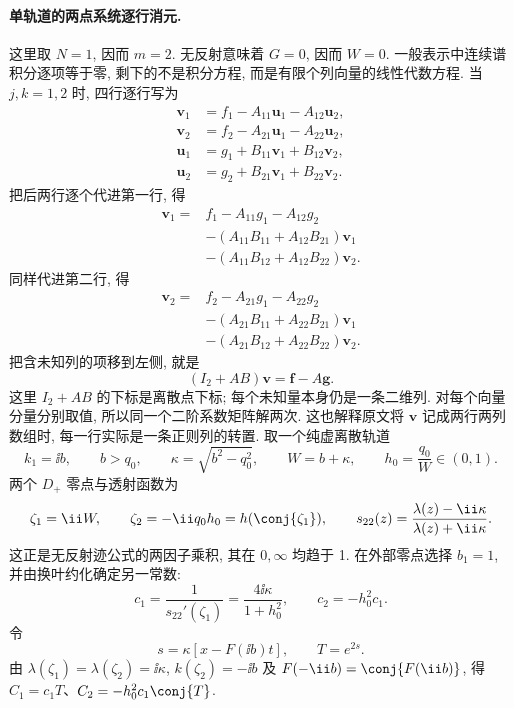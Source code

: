 \paragraph{单轨道的两点系统逐行消元.}
这里取 $N=1$, 因而 $m=2$. 无反射意味着 $G=0$, 因而 $W=0$.
一般表示中连续谱积分逐项等于零, 剩下的不是积分方程, 而是有限个列向量的线性代数方程.
当 $j,k=1,2$ 时, 四行逐行写为
\[
\begin{aligned}
\mathbf v_1
&=f_1- A_{11}\mathbf u_1- A_{12}\mathbf u_2,\\
\mathbf v_2
&=f_2- A_{21}\mathbf u_1- A_{22}\mathbf u_2,\\
\mathbf u_1
&=g_1+ B_{11}\mathbf v_1+ B_{12}\mathbf v_2,\\
\mathbf u_2
&=g_2+ B_{21}\mathbf v_1+ B_{22}\mathbf v_2.
\end{aligned}
\]
把后两行逐个代进第一行, 得
\[
\begin{aligned}
\mathbf v_1
={}&f_1- A_{11}g_1- A_{12}g_2\\
&-( A_{11} B_{11}
+ A_{12} B_{21})\mathbf v_1\\
&-( A_{11} B_{12}
+ A_{12} B_{22})\mathbf v_2.
\end{aligned}
\]
同样代进第二行, 得
\[
\begin{aligned}
\mathbf v_2
={}&f_2- A_{21}g_1- A_{22}g_2\\
&-( A_{21} B_{11}
+ A_{22} B_{21})\mathbf v_1\\
&-( A_{21} B_{12}
+ A_{22} B_{22})\mathbf v_2.
\end{aligned}
\]
把含未知列的项移到左侧, 就是
\[
(I_2+ A B)\boldsymbol v
=\boldsymbol f- A\boldsymbol g.
\]
这里 $I_2+ A B$ 的下标是离散点下标;
每个未知量本身仍是一条二维列.
对每个向量分量分别取值, 所以同一个二阶系数矩阵解两次.
这也解释原文将 $\boldsymbol v$ 记成两行两列数组时, 每一行实际是一条正则列的转置.
取一个纯虚离散轨道
\begin{equation}\label{eq:imaginarypoint}
k_1=\ii b,\qquad b>q_0,\qquad
\kappa=\sqrt{b^2-q_0^2},\qquad W=b+\kappa,\qquad h_0=\dfrac{q_0}{W}\in(0,1).
\end{equation}
两个 $D_+$ 零点与透射函数为
\begin{equation}\label{eq:onezeros}
\zeta_1=\ii W,\qquad \zeta_2=-\ii q_0h_0=h(\conj{\zeta_1}),\qquad
s_{22}(z)=\dfrac{\lambda(z)-\ii\kappa}{\lambda(z)+\ii\kappa}.
\end{equation}
这正是无反射迹公式的两因子乘积, 其在 $0,\infty$ 均趋于 1. 在外部零点选择 $b_1=1$, 并由换叶约化确定另一常数:
\begin{equation}\label{eq:onec}
c_1=\dfrac{1}{s_{22}'(\zeta_1)}=\dfrac{4\ii\kappa}{1+h_0^2},\qquad
c_2=-h_0^2c_1.
\end{equation}
令
\begin{equation}\label{eq:orbit-phase}
s=\kappa[x-F(\ii b)t],\qquad T=e^{2s}.
\end{equation}
由 $\lambda(\zeta_1)=\lambda(\zeta_2)=\ii\kappa$, $k(\zeta_2)=-\ii b$ 及 $F(-\ii b)=\conj{F(\ii b)}$, 得 $C_1=c_1T$、$C_2=-h_0^2c_1\conj{T}$.

